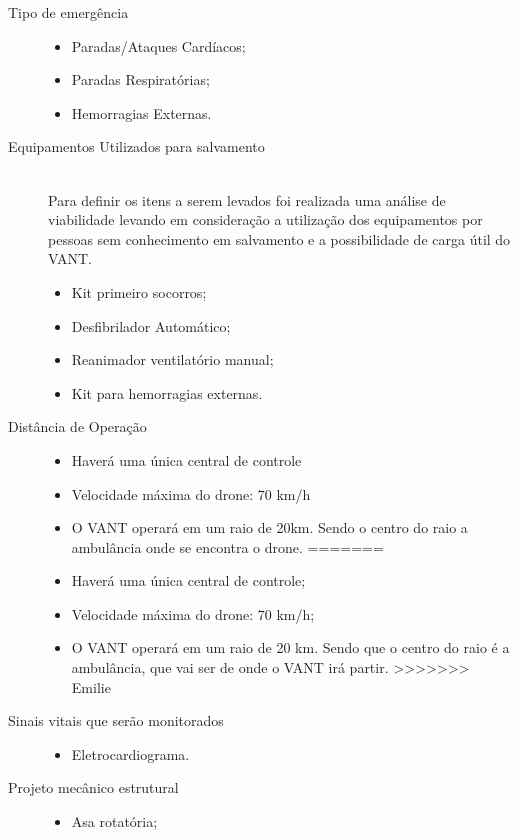 \begin{description}
\begin{itemize}
  	\end{itemize}
  \item[Tipo de emergência] \hfill 
  	\begin{itemize}
  		\item Paradas/Ataques Cardíacos;
		\item Paradas Respiratórias;
		\item Hemorragias Externas.
  	\end{itemize}
  \item[Equipamentos Utilizados para salvamento] \hfill \\
  	Para definir os itens a serem levados foi realizada uma análise de viabilidade levando em consideração a utilização dos equipamentos por pessoas sem conhecimento em salvamento e a possibilidade de carga útil do VANT.
  	\begin{itemize}
  		\item Kit primeiro socorros;
		\item Desfibrilador Automático;
		\item Reanimador ventilatório manual;
		\item Kit para hemorragias externas.
  	\end{itemize}
  \item[Distância de Operação] \hfill 
  	\begin{itemize}
<<<<<<< HEAD
  		\item Haverá uma única central de controle
  		\item Velocidade máxima do drone: 70 km/h
  		\item O VANT operará em um raio de 20km. Sendo o centro do raio a ambulância onde se encontra o drone.
=======
  		\item Haverá uma única central de controle;
  		\item Velocidade máxima do drone: 70 km/h;
  		\item O VANT operará em um raio de 20 km. Sendo que o centro do raio é a ambulância, que vai ser de onde o VANT irá partir.
>>>>>>> Emilie
  	\end{itemize}
  \item[Sinais vitais que serão monitorados] \hfill 
  	\begin{itemize}
  		\item Eletrocardiograma.
  	\end{itemize}
  \item[Projeto mecânico estrutural] \hfill 
  	\begin{itemize}
  		\item Asa rotatória;

\end{itemize}
\end{description}
